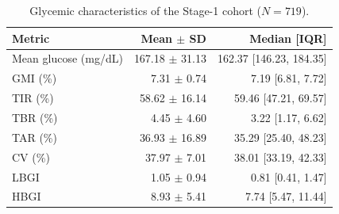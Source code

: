 \begin{table}[!t]
\centering
\caption{Glycemic characteristics of the Stage-1 cohort ($N=719$).}
\label{tab:cohort}
\begin{tabular}{lrr}
\toprule
Metric & Mean $\pm$ SD & Median [IQR] \\
\midrule
Mean glucose (mg/dL) & 167.18 $\pm$ 31.13 & 162.37 [146.23, 184.35] \\
GMI (\%) & 7.31 $\pm$ 0.74 & 7.19 [6.81, 7.72] \\
TIR (\%) & 58.62 $\pm$ 16.14 & 59.46 [47.21, 69.57] \\
TBR (\%) & 4.45 $\pm$ 4.60 & 3.22 [1.17, 6.62] \\
TAR (\%) & 36.93 $\pm$ 16.89 & 35.29 [25.40, 48.23] \\
CV (\%) & 37.97 $\pm$ 7.01 & 38.01 [33.19, 42.33] \\
LBGI & 1.05 $\pm$ 0.94 & 0.81 [0.41, 1.47] \\
HBGI & 8.93 $\pm$ 5.41 & 7.74 [5.47, 11.44] \\
\bottomrule
\end{tabular}
\end{table}
